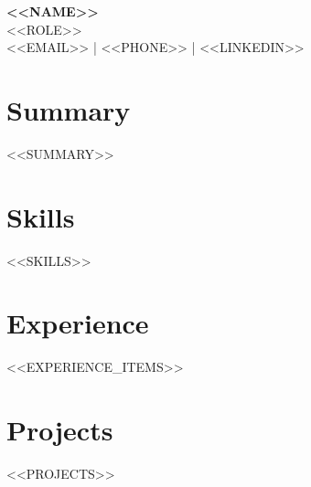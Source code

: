 \documentclass[letterpaper,11pt]{article}
\begin{document}
\begin{center}
    {\LARGE \textbf{<<NAME>>}} \\[4pt]
    {\large <<ROLE>>} \\[4pt]
    \small
    <<EMAIL>> \quad | \quad <<PHONE>> \quad | \quad <<LINKEDIN>>
\end{center}

\section{Summary}
<<SUMMARY>>

\section{Skills}
<<SKILLS>>

\section{Experience}
\begin{itemize}[leftmargin=*, itemsep=2pt]
<<EXPERIENCE_ITEMS>>
\end{itemize}

\section{Projects}
<<PROJECTS>>
\end{document}
